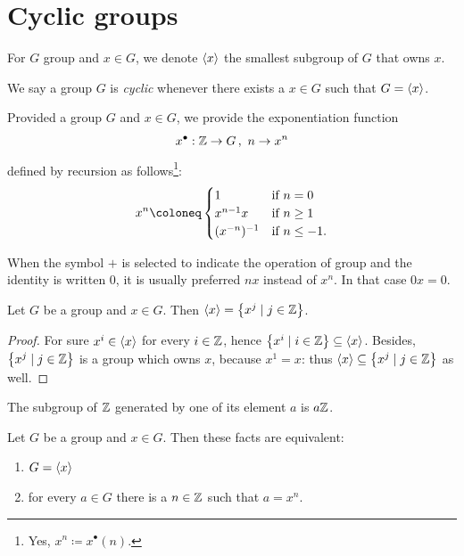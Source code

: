 
\section{Cyclic groups}

For \(G\) group and \(x \in G\), we denote \(\left\langle x\right\rangle\) the smallest subgroup of \(G\) that owns \(x\).

\begin{definition}
We say a group \(G\) is {\em cyclic} whenever there exists a \(x \in G\) such that \(G = \left\langle x\right\rangle\).
\end{definition}

\begin{definition}
Provided a group \(G\) and \(x \in G\), we provide the exponentiation function
\[x^\bullet : \mathbb Z \to G \,, \ n \to x^n\]
defined by recursion as follows\footnote{Yes, \(x^n \coloneq x^\bullet(n)\).}:
\[x^n \coloneq \begin{cases}
1        & \text{if } n = 0 \\
x^{n-1}x & \text{if } n \ge 1 \\
\inv{(x^{-n})}   & \text{if } n \le -1.
\end{cases}\]
\end{definition}

When the symbol \(+\) is selected to indicate the operation of group and the identity is written \(0\), it is usually preferred \(nx\) instead of \(x^n\). In that case \(0x = 0\).

\begin{proposition}
Let \(G\) be a group and \(x \in G\). Then \(\left\langle x\right\rangle = \left\{x^j \mid j \in \mathbb Z\right\}\).
\end{proposition}

\begin{proof}
For sure \(x^i \in \left\langle x\right\rangle\) for every \(i \in \mathbb Z\), hence \(\left\{x^i \mid i \in \mathbb Z\right\} \subseteq \left\langle x\right\rangle\). Besides, \(\left\{x^j \mid j \in \mathbb Z\right\}\) is a group which owns \(x\), because \(x^1 = x\): thus \(\left\langle x\right\rangle \subseteq \left\{x^j \mid j \in \mathbb Z\right\}\) as well.
\end{proof}

\begin{example}
The subgroup of \(\mathbb Z\) generated by one of its element \(a\) is \(a \mathbb Z\).
\end{example}

\begin{corollary}
Let \(G\) be a group and \(x \in G\). Then these facts are equivalent:
\begin{enumerate}
\item \(G = \left\langle x\right\rangle\)
\item for every \(a \in G\) there is a \(n \in \mathbb Z\) such that \(a = x^n\).
\end{enumerate}
\end{corollary}

